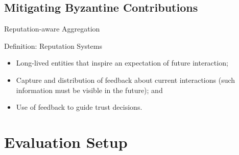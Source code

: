\documentclass[aspectratio=169,10pt]{imta}
\begin{document}
\subsection{Mitigating Byzantine Contributions}

\begin{frame}{Reputation-aware Aggregation}

  \begin{block}{Definition: Reputation Systems\normalfont~\autocite{resnick_Reputationsystems_2000}}
    \begin{itemize}
      \item Long-lived entities that inspire an expectation of future interaction;
      \item Capture and distribution of feedback about current interactions (such information must be visible in the future); and
      \item Use of feedback to guide trust decisions.
    \end{itemize}
  \end{block}



\end{frame}


\section{Evaluation Setup}
\end{document}
